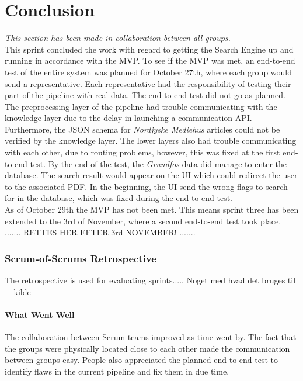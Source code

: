 \chapter{Conclusion}
\textit{This section has been made in collaboration between all groups.} \\

\noindent This sprint concluded the work with regard to getting the Search Engine up and running in accordance with the MVP. To see if the MVP was met, an end-to-end test of the entire system was planned for October 27th, where each group would send a representative. Each representative had the responsibility of testing their part of the pipeline with real data. The end-to-end test did not go as planned. The preprocessing layer of the pipeline had trouble communicating with the knowledge layer due to the delay in launching a communication API. Furthermore, the JSON schema for \textit{Nordjyske Mediehus} articles could not be verified by the knowledge layer.
The lower layers also had trouble communicating with each other, due to routing problems, however, this was fixed at the first end-to-end test. By the end of the test, the \textit{Grundfos} data did manage to enter the database. The search result would appear on the UI which could redirect the user to the associated PDF. In the beginning, the UI send the wrong flags to search for in the database, which was fixed during the end-to-end test.\\

\noindent As of October 29th the MVP has not been met. This means sprint three has been extended to the 3rd of November, where a second end-to-end test took place. \\
.......
RETTES HER EFTER 3rd NOVEMBER!
.......
\subsection{Scrum-of-Scrums Retrospective}
The retrospective is used for evaluating sprints.....
Noget med hvad det bruges til + kilde

\subsubsection{What Went Well}
The collaboration between Scrum teams improved as time went by. The fact that the groups were physically located close to each other made the communication between groups easy. People also appreciated the planned end-to-end test to identify flaws in the current pipeline and fix them in due time.

